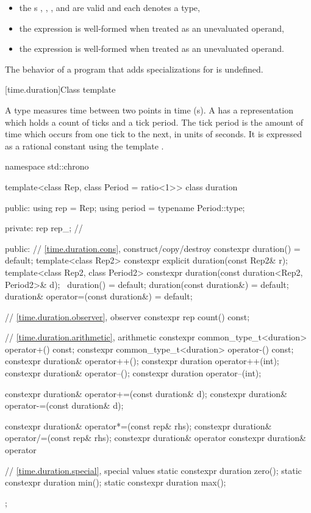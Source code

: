 \begin{itemize}
\item the s
,
,
, and
are valid and each denotes a type,
\item the expression
is well-formed when treated as an unevaluated operand,
\item the expression
is well-formed when treated as an unevaluated operand.
\end{itemize}

\pnum
The behavior of a program that adds specializations for  is undefined.

[time.duration]{Class template }

\pnum
A  type measures time between two points in time (s).
A  has a representation which holds a count of ticks and a tick period.
The tick period is the amount of time which occurs from one tick to the next, in units
of seconds. It is expressed as a rational constant using the template .

%
\begin{codeblock}
namespace std::chrono {
  template<class Rep, class Period = ratio<1>>
    class duration {
    public:
      using rep    = Rep;
      using period = typename Period::type;

    private:
      rep rep_;  // \expos

    public:
      // \ref{time.duration.cons}, construct/copy/destroy
      constexpr duration() = default;
      template<class Rep2>
        constexpr explicit duration(const Rep2& r);
      template<class Rep2, class Period2>
        constexpr duration(const duration<Rep2, Period2>& d);
      ~duration() = default;
      duration(const duration&) = default;
      duration& operator=(const duration&) = default;

      // \ref{time.duration.observer}, observer
      constexpr rep count() const;

      // \ref{time.duration.arithmetic}, arithmetic
      constexpr common_type_t<duration> operator+() const;
      constexpr common_type_t<duration> operator-() const;
      constexpr duration& operator++();
      constexpr duration  operator++(int);
      constexpr duration& operator--();
      constexpr duration  operator--(int);

      constexpr duration& operator+=(const duration& d);
      constexpr duration& operator-=(const duration& d);

      constexpr duration& operator*=(const rep& rhs);
      constexpr duration& operator/=(const rep& rhs);
      constexpr duration& operator%
      constexpr duration& operator%

      // \ref{time.duration.special}, special values
      static constexpr duration zero();
      static constexpr duration min();
      static constexpr duration max();
  };
}
\end{codeblock}

